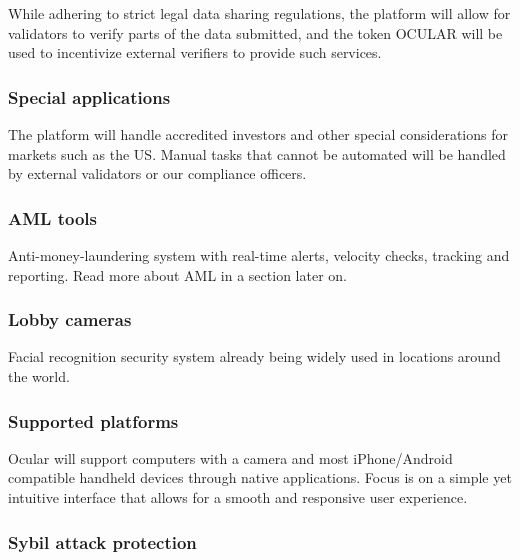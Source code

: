 \documentclass[a4paper]{article}
\begin{document}
While adhering to strict legal data sharing regulations, the platform will allow for validators to verify parts of the data submitted, and the token OCULAR will be used to incentivize external verifiers to provide such services.

\subsubsection*{Special applications}
The platform will handle accredited investors and other special considerations for markets such as the US. Manual tasks that cannot be automated will be handled by external validators or our compliance officers. 

\subsubsection*{AML tools}
Anti-money-laundering system with real-time alerts, velocity checks, tracking and reporting. Read more about AML in a section later on.

\subsubsection*{Lobby cameras}
Facial recognition security system already being widely used in locations around the world.

\subsubsection*{Supported platforms}

Ocular will support computers with a camera and most iPhone/Android compatible handheld devices through native applications. Focus is on a simple yet intuitive interface that allows for a smooth and responsive user experience.

\subsubsection*{Sybil attack protection}
\end{document}
